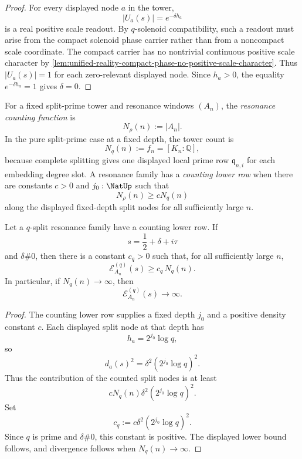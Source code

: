 \begin{proof}
For every displayed node $a$ in the tower,
$$
|U_a(s)|=e^{-\delta h_a}
$$
is a real positive scale readout.  By $q$-solenoid compatibility, such a
readout must arise from the compact solenoid phase carrier rather than
from a noncompact scale coordinate.  The compact carrier has no
nontrivial continuous positive scale character by
\autoref{lem:unified-reality-compact-phase-no-positive-scale-character}.
Thus $|U_a(s)|=1$ for each zero-relevant displayed node.  Since
$h_a>0$, the equality $e^{-\delta h_a}=1$ gives $\delta=0$.
\end{proof}

\begin{definition}
\label{def:unified-reality-resonance-counting-lower-row}
For a fixed split-prime tower and resonance windows $(A_n)$, the
\emph{resonance counting function} is
$$
N_{\rho}(n):=|A_n|.
$$
In the pure split-prime case at a fixed depth, the tower count is
$$
N_q(n):=f_n=[K_n:\mathbb Q],
$$
because complete splitting gives one displayed local prime row
$\mathfrak q_{n,i}$ for each embedding degree slot.  A resonance family
has a \emph{counting lower row} when there are constants $c>0$ and
$j_0:\NatUp$ such that
$$
N_{\rho}(n)\ge cN_q(n)
$$
along the displayed fixed-depth split nodes for all sufficiently large
$n$.
\end{definition}

\begin{theorem}
\label{thm:unified-reality-counting-lower-rows-force-off-half-energy-growth}
Let a $q$-split resonance family have a counting lower row.  If
$$
s=\frac12+\delta+i\tau
$$
and $\delta\#0$, then there is a constant $c_q>0$ such that, for all
sufficiently large $n$,
$$
\mathcal E_{A_n}^{(q)}(s)\ge c_q\,N_q(n).
$$
In particular, if $N_q(n)\to\infty$, then
$$
\mathcal E_{A_n}^{(q)}(s)\to\infty.
$$
\end{theorem}

\begin{proof}
The counting lower row supplies a fixed depth $j_0$ and a positive
density constant $c$.  Each displayed split node at that depth has
$$
h_a=2^{j_0}\log q,
$$
so
$$
d_a(s)^2=\delta^2(2^{j_0}\log q)^2.
$$
Thus the contribution of the counted split nodes is at least
$$
cN_q(n)\delta^2(2^{j_0}\log q)^2.
$$
Set
$$
c_q:=c\delta^2(2^{j_0}\log q)^2.
$$
Since $q$ is prime and $\delta\#0$, this constant is positive.  The
displayed lower bound follows, and divergence follows when
$N_q(n)\to\infty$.
\end{proof}

